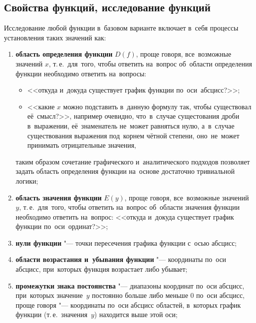 \documentclass[]{scrartcl}
\begin{document}
\subsection{Свойства функций, исследование функций}
Исследование любой функции в~базовом варианте включает в~себя процессы установления таких значений как:
\begin{enumerate}
	\item \textbf{область определения функции} ${\textstyle D(f)}$, проще говоря, все~возможные значений ${\textstyle x}$, т.\,е.~для~того, чтобы ответить на~вопрос об~области определения функции необходимо ответить на~вопросы:
	\begin{itemize}
		\item  <<откуда и~докуда существует график функции по~оси~абсцисс?>>;
		\item <<какие ${\textstyle x}$ можно подставить в~данную формулу так, чтобы существовал её~смысл?>>, например очевидно, что~в~случае сущестования дроби в~выражении, её~знаменатель не~может равняться нулю, а~в~случае существования выражения под~корнем чётной степени, оно~не~может принимать отрицательные значения,
	\end{itemize}
	таким образом сочетание графического и~аналитического подходов позволяет задать область определения функции на~основе достаточно тривиальной логики;
	\item \textbf{область значения функции} ${\textstyle E(y)}$, проще говоря, все~возможные значений ${\textstyle y}$, т.\,е.~для~того, чтобы ответить на~вопрос об~области значения функции необходимо ответить на~вопрос: <<откуда и~докуда существует график функции по~оси~ординат?>>;
	\item \textbf{нули функции} "--- точки пересечения графика функции с~осью абсцисс;
	\item \textbf{области возрастания и~убывания функции} "--- координаты по~оси абсцисс, при~которых функция возрастает либо убывает;
	\item \textbf{промежутки знака постоянства} "--- диапазоны координат по~оси абсцисс, при~которых значение~${\textstyle y}$ постоянно больше либо меньше ${\textstyle 0}$ по~оси абсцисс, проще говоря "--- координаты по~оси абсцисс областей, в~которых график функции (т.\,е.~значения~${\textstyle y}$) находится выше этой оси;

\end{enumerate}
\end{document}
